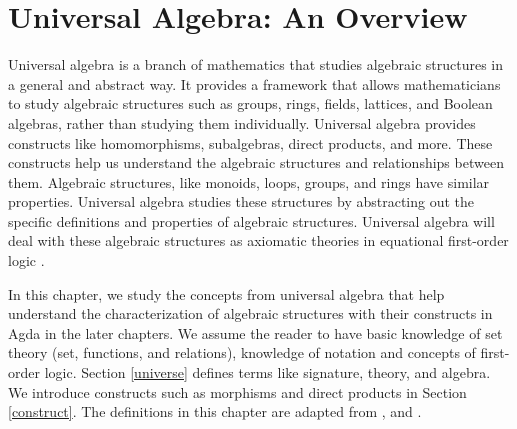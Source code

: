 \chapter{Universal Algebra: An Overview}
\label{start}
Universal algebra is a branch of mathematics that studies algebraic structures
in a general and abstract way. It provides a framework that allows
mathematicians to study algebraic structures such as groups, rings, fields,
lattices, and Boolean algebras, rather than studying them individually.
Universal algebra provides constructs like homomorphisms, subalgebras, direct
products, and more. These constructs help us understand the algebraic structures
and relationships between them. Algebraic structures, like monoids, loops,
groups, and rings have similar properties. Universal algebra studies these
structures by abstracting out the specific definitions and properties of
algebraic structures. Universal algebra will deal with these algebraic
structures as axiomatic theories in equational first-order logic
\cite{YSharoda}. 

In this chapter, we study the concepts from universal algebra that help
understand the characterization of algebraic structures with their constructs in
Agda in the later chapters. We assume the reader to have basic knowledge of set
theory (set, functions, and relations), knowledge of notation and concepts of
first-order logic. Section \ref{universe} defines terms like signature, theory,
and algebra. We introduce constructs such as morphisms and direct products in
Section \ref{construct}. The definitions in this chapter are adapted from
\cite{sankappanavar1981course}, \cite{wechler2012universal} and
\cite{sannella2012foundations}. 

